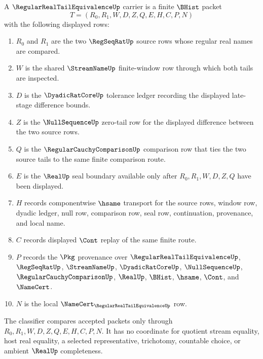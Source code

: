 \begin{definition}
\label{def:regular-real-tail-equivalence-carrier}
A $\RegularRealTailEquivalenceUp$ carrier is a finite $\BHist$ packet
$$
T=(R_0,R_1,W,D,Z,Q,E,H,C,P,N)
$$
with the following displayed rows:
\begin{enumerate}
\item $R_0$ and $R_1$ are the two $\RegSeqRatUp$ source rows whose regular real names are compared.
\item $W$ is the shared $\StreamNameUp$ finite-window row through which both tails are inspected.
\item $D$ is the $\DyadicRatCoreUp$ tolerance ledger recording the displayed late-stage difference bounds.
\item $Z$ is the $\NullSequenceUp$ zero-tail row for the displayed difference between the two source rows.
\item $Q$ is the $\RegularCauchyComparisonUp$ comparison row that ties the two source tails to the same finite comparison route.
\item $E$ is the $\RealUp$ seal boundary available only after $R_0,R_1,W,D,Z,Q$ have been displayed.
\item $H$ records componentwise $\hsame$ transport for the source rows, window row, dyadic ledger, null row, comparison row, seal row, continuation, provenance, and local name.
\item $C$ records displayed $\Cont$ replay of the same finite route.
\item $P$ records the $\Pkg$ provenance over $\RegularRealTailEquivalenceUp$, $\RegSeqRatUp$, $\StreamNameUp$, $\DyadicRatCoreUp$, $\NullSequenceUp$, $\RegularCauchyComparisonUp$, $\RealUp$, $\BHist$, $\hsame$, $\Cont$, and $\NameCert$.
\item $N$ is the local $\NameCert_{\RegularRealTailEquivalenceUp}$ row.
\end{enumerate}
The classifier compares accepted packets only through $R_0,R_1,W,D,Z,Q,E,H,C,P,N$. It has no coordinate for quotient stream equality, host real equality, a selected representative, trichotomy, countable choice, or ambient $\RealUp$ completeness.
\end{definition}

